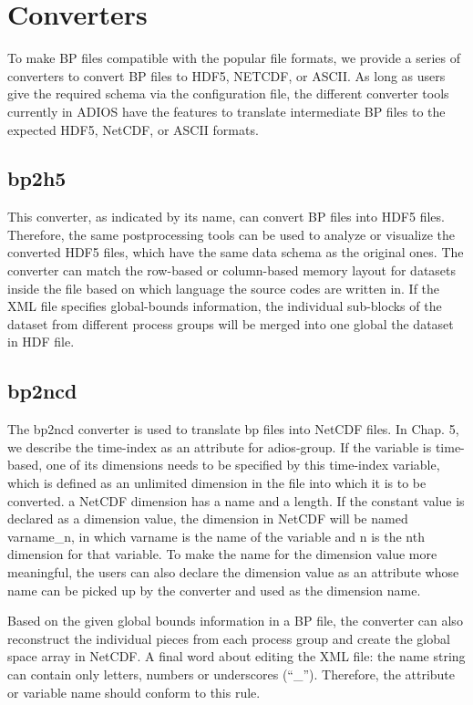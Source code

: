 \chapter{Converters}

To make BP files compatible with the popular file formats, we provide a series 
of converters to convert BP files to HDF5, NETCDF, or ASCII. As long as users give 
the required schema via the configuration file, the different converter tools currently 
in ADIOS have the features to translate intermediate BP files to the expected HDF5, 
NetCDF, or ASCII formats.

\section{bp2h5}

This converter, as indicated by its name, can convert BP files into HDF5 files. 
Therefore, the same postprocessing tools can be used to analyze or visualize the 
converted HDF5 files, which have the same data schema as the original ones. The 
converter can match the row-based or column-based memory layout for datasets inside 
the file based on which language the source codes are written in.  If the XML file 
specifies global-bounds information, the individual sub-blocks of the dataset from 
different process groups will be merged into one global the dataset in HDF file.

\section{bp2ncd}

The bp2ncd converter is used to translate bp files into NetCDF files. In Chap. 
5, we describe the time-index as an attribute for adios-group. If the variable 
is time-based, one of its dimensions needs to be specified by this time-index variable, 
which is defined as an unlimited dimension in the file into which it is to be converted. 
a NetCDF dimension has a name and a length. If the constant value is declared as 
a dimension value, the dimension in NetCDF will be named varname\_n, in which varname 
is the name of the variable and n is the nth dimension for that variable. To make 
the name for the dimension value more meaningful, the users can also declare the 
dimension value as an attribute whose name can be picked up by the converter and 
used as the dimension name.

Based on the given global bounds information in a BP file, the converter can also 
reconstruct the individual pieces from each process group and create the global 
space array in NetCDF. A final word about editing the XML file: the name string 
can contain only letters, numbers or underscores (``\_''). Therefore, the attribute 
or variable name should conform to this rule. 

